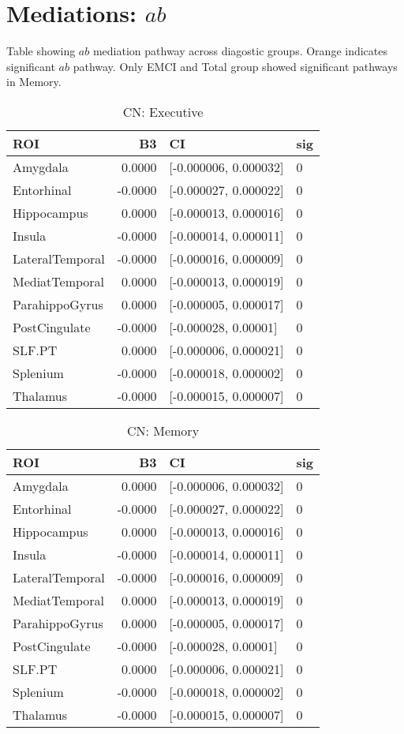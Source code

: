 \documentclass{article}
\begin{document}
\section*{Mediations: $ab$}
Table showing $ab$ mediation pathway across diagostic groups. Orange indicates significant $ab$ pathway. Only EMCI and Total group showed significant pathways in Memory. 
\begin{table}[H]
\centering
\caption{CN: Executive} 
\begin{tabular}{lrll}
  \toprule
ROI & B3 & CI & sig \\ 
  \midrule
Amygdala & 0.0000 & [-0.000006, 0.000032] & 0 \\ 
  Entorhinal & -0.0000 & [-0.000027, 0.000022] & 0 \\ 
  Hippocampus & 0.0000 & [-0.000013, 0.000016] & 0 \\ 
  Insula & -0.0000 & [-0.000014, 0.000011] & 0 \\ 
  LateralTemporal & -0.0000 & [-0.000016, 0.000009] & 0 \\ 
  MediatTemporal & 0.0000 & [-0.000013, 0.000019] & 0 \\ 
  ParahippoGyrus & 0.0000 & [-0.000005, 0.000017] & 0 \\ 
  PostCingulate & -0.0000 & [-0.000028, 0.00001] & 0 \\ 
  SLF.PT & 0.0000 & [-0.000006, 0.000021] & 0 \\ 
  Splenium & -0.0000 & [-0.000018, 0.000002] & 0 \\ 
  Thalamus & -0.0000 & [-0.000015, 0.000007] & 0 \\ 
   \bottomrule
\end{tabular}
\end{table}%
\begin{table}[H]
\centering
\caption{CN: Memory} 
\begin{tabular}{lrll}
  \toprule
ROI & B3 & CI & sig \\ 
  \midrule
Amygdala & 0.0000 & [-0.000006, 0.000032] & 0 \\ 
  Entorhinal & -0.0000 & [-0.000027, 0.000022] & 0 \\ 
  Hippocampus & 0.0000 & [-0.000013, 0.000016] & 0 \\ 
  Insula & -0.0000 & [-0.000014, 0.000011] & 0 \\ 
  LateralTemporal & -0.0000 & [-0.000016, 0.000009] & 0 \\ 
  MediatTemporal & 0.0000 & [-0.000013, 0.000019] & 0 \\ 
  ParahippoGyrus & 0.0000 & [-0.000005, 0.000017] & 0 \\ 
  PostCingulate & -0.0000 & [-0.000028, 0.00001] & 0 \\ 
  SLF.PT & 0.0000 & [-0.000006, 0.000021] & 0 \\ 
  Splenium & -0.0000 & [-0.000018, 0.000002] & 0 \\ 
  Thalamus & -0.0000 & [-0.000015, 0.000007] & 0 \\ 
   \bottomrule
\end{tabular}
\end{table}
\end{document}
